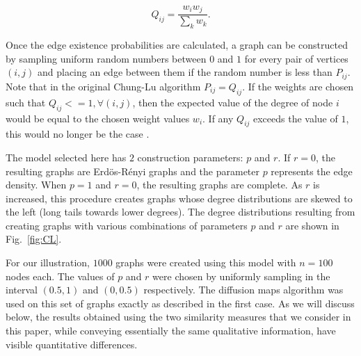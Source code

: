 \begin{equation}\label{}
  Q_{ij} = \frac{w_iw_j}{\sum_{k}{w_k}}.
\end{equation}

Once the edge existence probabilities are calculated, a graph can be
constructed by sampling uniform random numbers between $0$ and $1$ for
every pair of vertices $(i,j)$ and placing an edge between them if the
random number is less than $P_{ij}$.
% 
Note that in the original Chung-Lu algorithm $P_{ij}=Q_{ij}$.
% 
If the weights are chosen such that $Q_{ij} <= 1, \forall (i,j)$, then
the expected value of the degree of node $i$ would be equal to the
chosen weight values $w_i$.
% 
If any $Q_{ij}$ exceeds the value of $1$, this would no longer be the
case \cite{chung_connected_2002}.

% 

The model selected here has $2$ construction parameters: $p$ and $r$.
% 
If $r=0$, the resulting graphs are Erd\"{o}s-R\'{e}nyi graphs and the
parameter $p$ represents the edge density.
% 
When $p=1$ and $r=0$, the resulting graphs are complete.
% 
As $r$ is increased, this procedure creates graphs whose degree
distributions are skewed to the left (long tails towards lower
degrees).
% 
The degree distributions resulting from creating graphs with various
combinations of parameters $p$ and $r$ are shown in Fig.~\ref{fig:CL}.
% 

For our illustration, $1000$ graphs were created using this model with
$n=100$ nodes each.
% 
The values of $p$ and $r$ were chosen by uniformly sampling in the
interval $(0.5,1)$ and $(0,0.5)$ respectively.
% 
The diffusion maps algorithm was used on this set of graphs exactly as
described in the first case.
% 
As we will discuss below, the results obtained using the two
similarity measures that we consider in this paper, while conveying
essentially the same qualitative information, have visible
quantitative differences.
% 


